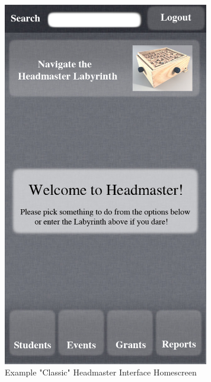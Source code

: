 \documentclass{article}
\begin{document}
\begin{figure}[ht!]
\centering
\includegraphics[width=90mm]{classic-homepage.jpg}
\caption{Example "Classic" Headmaster Interface Homescreen}
\label{overflow}
\end{figure}
\end{document}
